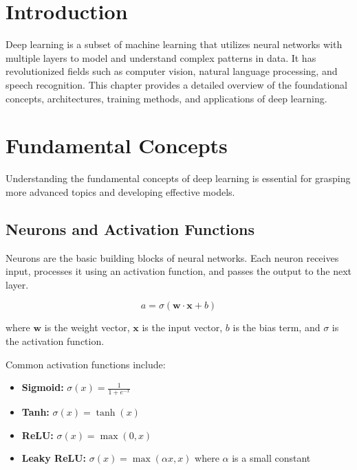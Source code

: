 \section{Introduction}
Deep learning is a subset of machine learning that utilizes neural networks with multiple layers to model and understand complex patterns in data. It has revolutionized fields such as computer vision, natural language processing, and speech recognition. This chapter provides a detailed overview of the foundational concepts, architectures, training methods, and applications of deep learning.

\section{Fundamental Concepts}
Understanding the fundamental concepts of deep learning is essential for grasping more advanced topics and developing effective models.

\subsection{Neurons and Activation Functions}
Neurons are the basic building blocks of neural networks. Each neuron receives input, processes it using an activation function, and passes the output to the next layer.

\begin{equation}
a = \sigma(\mathbf{w} \cdot \mathbf{x} + b)
\end{equation}

where \( \mathbf{w} \) is the weight vector, \( \mathbf{x} \) is the input vector, \( b \) is the bias term, and \( \sigma \) is the activation function.

Common activation functions include:
\begin{itemize}
    \item \textbf{Sigmoid:} \( \sigma(x) = \frac{1}{1 + e^{-x}} \)
    \item \textbf{Tanh:} \( \sigma(x) = \tanh(x) \)
    \item \textbf{ReLU:} \( \sigma(x) = \max(0, x) \)
    \item \textbf{Leaky ReLU:} \( \sigma(x) = \max(\alpha x, x) \) where \( \alpha \) is a small constant
\end{itemize}


